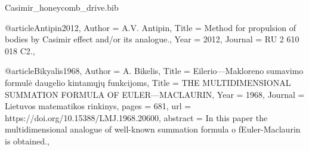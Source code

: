 \documentclass[twoside, 10pt, ptm]{article}
\def\myfilename{Casimir_honeycomb_drive}
\begin{document}
\begin{multicols}{2}
\begin{filecontents}{\myfilename.bib}

@article{Antipin2012,
    Author = {A.V. Antipin},
    Title = {Method for propulsion of bodies by Casimir effect and/or its analogue.},
    Year = {2012},
    Journal = {RU 2 610 018 C2.},
}


@article{Bikyalis1968,
    Author = {A. Bikelis},
    Title = {Eilerio—Makloreno sumavimo formulė daugelio kintamųjų funkcijoms},
    Title = {THE MULTIDIMENSIONAL SUMMATION FORMULA OF EULER—MACLAURIN},
    Year = {1968},
    Journal = {Lietuvos matematikos rinkinys},
    pages = {681},
    url = {https://doi.org/10.15388/LMJ.1968.20600},
    abstract = {In this paper the multidimensional analogue of well-known summation formula o fEuler-Maclaurin is obtained.},
}



\end{filecontents}
\end{multicols}
\end{document}
